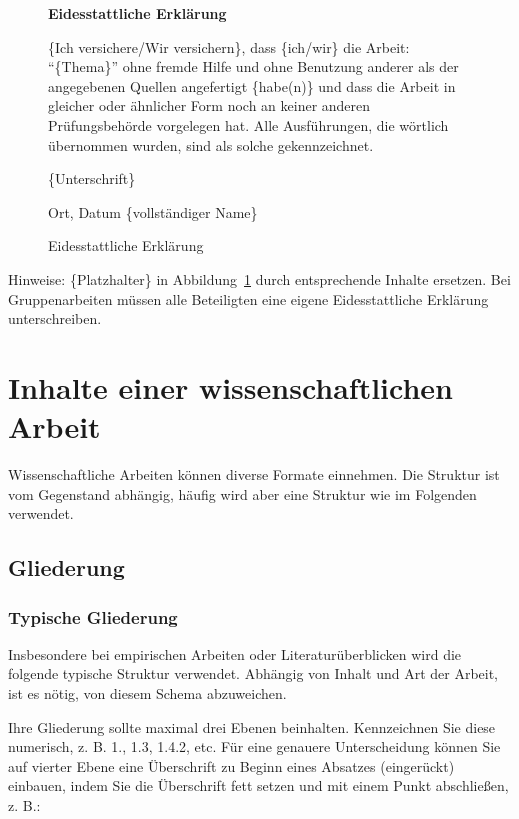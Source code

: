 \documentclass[
  letterpaper,
  DIV=11]{scrreprt}
\begin{document}
\begin{figure}

\textbf{Eidesstattliche Erklärung}

\{Ich versichere/Wir versichern\}, dass \{ich/wir\} die Arbeit:
``\{Thema\}'' ohne fremde Hilfe und ohne Benutzung anderer als der
angegebenen Quellen angefertigt \{habe(n)\} und dass die Arbeit in
gleicher oder ähnlicher Form noch an keiner anderen Prüfungsbehörde
vorgelegen hat. Alle Ausführungen, die wörtlich übernommen wurden, sind
als solche gekennzeichnet.

\{Unterschrift\}

Ort, Datum \{vollständiger Name\}

\caption{\label{fig-eid}Eidesstattliche Erklärung}

\end{figure}

Hinweise: \{Platzhalter\} in Abbildung~\ref{fig-eid} durch entsprechende
Inhalte ersetzen. Bei Gruppenarbeiten müssen alle Beteiligten eine
eigene Eidesstattliche Erklärung unterschreiben.

\hypertarget{inhalte-einer-wissenschaftlichen-arbeit}{%
\chapter{Inhalte einer wissenschaftlichen
Arbeit}\label{inhalte-einer-wissenschaftlichen-arbeit}}

Wissenschaftliche Arbeiten können diverse Formate einnehmen. Die
Struktur ist vom Gegenstand abhängig, häufig wird aber eine Struktur wie
im Folgenden verwendet.

\hypertarget{gliederung}{%
\section{Gliederung}\label{gliederung}}

\hypertarget{typische-gliederung}{%
\subsection{Typische Gliederung}\label{typische-gliederung}}

Insbesondere bei empirischen Arbeiten oder Literaturüberblicken wird die
folgende typische Struktur verwendet. Abhängig von Inhalt und Art der
Arbeit, ist es nötig, von diesem Schema abzuweichen.

Ihre Gliederung sollte maximal drei Ebenen beinhalten. Kennzeichnen Sie
diese numerisch, z. B. 1., 1.3, 1.4.2, etc. Für eine genauere
Unterscheidung können Sie auf vierter Ebene eine Überschrift zu Beginn
eines Absatzes (eingerückt) einbauen, indem Sie die Überschrift fett
setzen und mit einem Punkt abschließen, z. B.:
\end{document}
